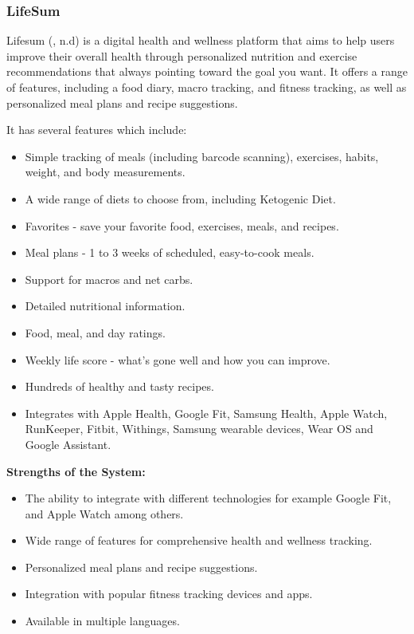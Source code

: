 \documentclass{article}
\begin{document}
\subsubsection{LifeSum}

Lifesum (, n.d) is a digital health and wellness platform that aims to help users improve their overall health through personalized nutrition and exercise recommendations that always pointing toward the goal you want. It offers a range of features, including a food diary, macro tracking, and fitness tracking, as well as personalized meal plans and recipe suggestions.

It has several features which include:
\begin{itemize}
\item Simple tracking of meals (including barcode scanning), exercises, habits, weight, and body measurements.
\item A wide range of diets to choose from, including Ketogenic Diet.
\item Favorites - save your favorite food, exercises, meals, and recipes.
\item Meal plans - 1 to 3 weeks of  scheduled, easy-to-cook meals.
\item Support for macros and net carbs.
\item Detailed nutritional information.
\item Food, meal, and day ratings.
\item Weekly life score - what's gone well and how you can improve.
\item Hundreds of healthy and tasty recipes.
\item Integrates with Apple Health, Google Fit, Samsung Health, Apple Watch, RunKeeper, Fitbit, Withings, Samsung wearable devices, Wear OS and Google Assistant.
\end{itemize}

\textbf{Strengths of the System:}
\begin{itemize}
\item The ability to integrate with different technologies for example Google Fit, and Apple Watch among others.
\item Wide range of features for comprehensive health and wellness tracking.
\item Personalized meal plans and recipe suggestions.
\item Integration with popular fitness tracking devices and apps.
\item Available in multiple languages.
\end{itemize}
\end{document}
